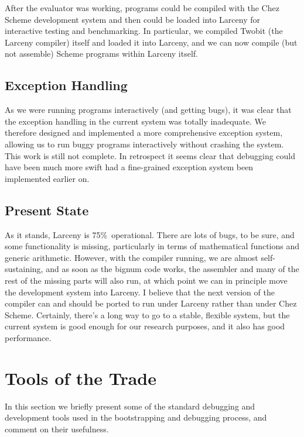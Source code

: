 After the evaluator was working, programs could be compiled with the Chez
Scheme development system and then could be loaded into Larceny for
interactive testing and benchmarking. In particular, we compiled Twobit (the
Larceny compiler) itself and loaded it into Larceny, and we can now compile
(but not assemble) Scheme programs within Larceny itself.

\subsection{Exception Handling}

As we were running programs interactively (and getting bugs), it was clear
that the exception handling in the current system was totally inadequate.
We therefore designed and implemented a more comprehensive exception system,
allowing us to run buggy programs interactively without crashing the system.
This work is still not complete. In retrospect it seems clear that debugging
could have been much more swift had a fine-grained exception system been
implemented earlier on.

\subsection{Present State}

As it stands, Larceny is 75\%\ operational. There are lots of bugs, to be
sure, and some functionality is missing, particularly in terms of
mathematical functions and generic arithmetic. However, with the compiler
running, we are almost self-sustaining, and as soon as the bignum code
works, the assembler and many of the rest of the missing parts will also
run, at which point we can in principle move the development system into
Larceny.  I believe that the next version of the compiler can and should be
ported to run under Larceny rather than under Chez Scheme. Certainly,
there's a long way to go to a stable, flexible system, but the current
system is good enough for our research purposes, and it also has good
performance.

\section{Tools of the Trade}

In this section we briefly present some of the standard debugging and
development tools used in the bootstrapping and debugging process, and
comment on their usefulness.

